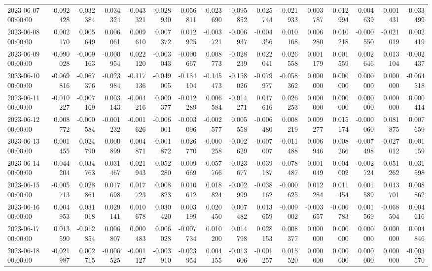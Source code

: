 \begin{tabular}{lrrrrrrrrrrrrrrr}
2023-06-07 00:00:00 & -0.092428 & -0.032384 & -0.034324 & -0.043321 & -0.028930 & -0.056811 & -0.023690 & -0.095852 & -0.025744 & -0.021933 & -0.003787 & -0.012994 & 0.004639 & -0.001431 & -0.033499 \\
2023-06-08 00:00:00 & 0.002170 & 0.005649 & 0.006061 & 0.009610 & 0.007372 & 0.012925 & -0.003721 & -0.006937 & -0.004356 & 0.010168 & 0.006280 & 0.010218 & -0.000550 & -0.021019 & 0.002419 \\
2023-06-09 00:00:00 & -0.090028 & -0.009163 & -0.000954 & 0.022120 & -0.003043 & -0.000667 & 0.008773 & -0.028239 & 0.022041 & 0.026558 & 0.001179 & 0.001559 & 0.002646 & 0.013104 & -0.002437 \\
2023-06-10 00:00:00 & -0.069816 & -0.067376 & -0.023984 & -0.117136 & -0.049005 & -0.134104 & -0.145473 & -0.158026 & -0.079977 & -0.058362 & 0.000000 & 0.000000 & 0.000000 & 0.000000 & -0.064518 \\
2023-06-11 00:00:00 & -0.010227 & -0.007169 & 0.003143 & -0.004216 & 0.000377 & -0.012289 & 0.006584 & -0.014271 & 0.017616 & 0.026253 & 0.000000 & 0.000000 & 0.000000 & 0.000000 & 0.000414 \\
2023-06-12 00:00:00 & 0.008772 & -0.000584 & -0.001232 & -0.001626 & -0.006001 & -0.003096 & -0.002577 & 0.005558 & -0.006480 & 0.008219 & 0.009277 & 0.015174 & -0.000060 & 0.081875 & 0.007659 \\
2023-06-13 00:00:00 & 0.001455 & 0.024790 & 0.000899 & 0.004871 & -0.001872 & 0.026770 & -0.000258 & -0.002629 & -0.007007 & -0.011488 & 0.006946 & 0.008266 & -0.007498 & -0.027012 & 0.001159 \\
2023-06-14 00:00:00 & -0.044204 & -0.034763 & -0.031467 & -0.021943 & -0.052280 & -0.009669 & -0.057766 & -0.023677 & -0.039187 & -0.078487 & 0.001049 & 0.004002 & -0.002724 & -0.051262 & -0.031598 \\
2023-06-15 00:00:00 & -0.005713 & 0.028861 & 0.017698 & 0.017723 & 0.008823 & 0.010612 & 0.018824 & -0.002999 & -0.038162 & -0.000625 & 0.012284 & 0.011454 & 0.001589 & 0.043701 & 0.008862 \\
2023-06-16 00:00:00 & 0.004953 & 0.031018 & 0.029141 & 0.010678 & 0.030420 & 0.003199 & 0.020450 & 0.007482 & 0.013659 & -0.009002 & -0.003657 & -0.006783 & 0.001569 & -0.068504 & 0.004616 \\
2023-06-17 00:00:00 & 0.013590 & -0.012854 & 0.006807 & 0.000483 & 0.006028 & -0.007734 & 0.010200 & 0.014798 & 0.028153 & 0.008377 & 0.000000 & 0.000000 & 0.000000 & 0.000000 & 0.004846 \\
2023-06-18 00:00:00 & -0.021987 & 0.002715 & -0.006525 & -0.001127 & -0.003910 & -0.023954 & 0.004155 & -0.013606 & -0.001257 & 0.015520 & 0.000000 & 0.000000 & 0.000000 & 0.000000 & -0.003570 \\

\end{tabular}
